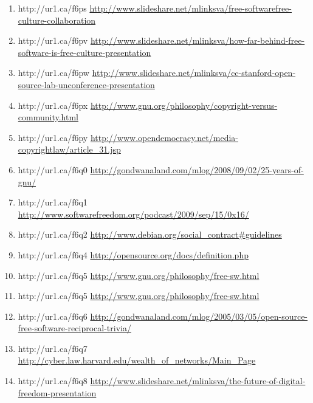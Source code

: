 \begin{enumerate}
    \item{http://ur1.ca/f6ps}
        \url{http://www.slideshare.net/mlinksva/free-softwarefree-culture-collaboration}

    \item{http://ur1.ca/f6pv}
        \url{http://www.slideshare.net/mlinksva/how-far-behind-free-software-is-free-culture-presentation}

    \item{http://ur1.ca/f6pw}
        \url{http://www.slideshare.net/mlinksva/cc-stanford-open-source-lab-unconference-presentation}

    \item{http://ur1.ca/f6px}
        \url{http://www.gnu.org/philosophy/copyright-versus-community.html}

    \item{http://ur1.ca/f6py}
        \url{http://www.opendemocracy.net/media-copyrightlaw/article\_31.jsp}

    \item{http://ur1.ca/f6q0}
        \url{http://gondwanaland.com/mlog/2008/09/02/25-years-of-gnu/}

    \item{http://ur1.ca/f6q1}
        \url{http://www.softwarefreedom.org/podcast/2009/sep/15/0x16/}

    \item{http://ur1.ca/f6q2}
        \url{http://www.debian.org/social\_contract#guidelines}

    \item{http://ur1.ca/f6q4}
        \url{http://opensource.org/docs/definition.php}

    \item{http://ur1.ca/f6q5}
        \url{http://www.gnu.org/philosophy/free-sw.html}

    \item{http://ur1.ca/f6q5}
        \url{http://www.gnu.org/philosophy/free-sw.html}

    \item{http://ur1.ca/f6q6}
        \url{http://gondwanaland.com/mlog/2005/03/05/open-source-free-software-reciprocal-trivia/}

    \item{http://ur1.ca/f6q7}
        \url{http://cyber.law.harvard.edu/wealth\_of\_networks/Main\_Page}

    \item{http://ur1.ca/f6q8}
        \url{http://www.slideshare.net/mlinksva/the-future-of-digital-freedom-presentation}


\end{enumerate}
